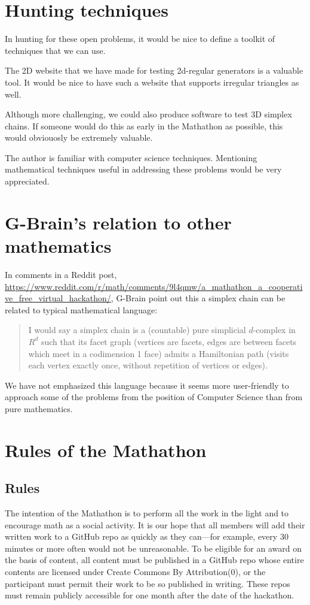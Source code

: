 \documentclass[11pt]{article}
\begin{document}
\section{Hunting techniques}

In hunting for these open problems, it would be nice to define a toolkit of techniques that we can use.

The 2D website that we have made for testing 2d-regular generators is a valuable tool.
It would be nice to have such a website that supports irregular triangles as well.

Although more challenging, we could also produce software to test 3D simplex chains.
If someone would do this as early in the Mathathon as possible, this would obviouosly be extremely valuable.

The author is familiar with computer science techniques. Mentioning mathematical techniques useful in addressing these problems would be
very appreciated.

\section{G-Brain's relation to other mathematics}

In comments in a Reddit post, \url{https://www.reddit.com/r/math/comments/9l4qmw/a_mathathon_a_cooperative_free_virtual_hackathon/},
G-Brain point out this a simplex chain can be related to typical mathematical language:
\begin{quote}
  I would say a simplex chain is a (countable) pure simplicial $d$-complex in $R^d$ such that its facet graph (vertices are facets, edges are between facets which meet in a codimension 1 face) admits a Hamiltonian path (visits each vertex exactly once, without repetition of vertices or edges).
\end{quote}
We have not emphasized this language because it seems more user-friendly to approach some of the problems from the position of Computer Science than from pure mathematics.

\section{Rules of the Mathathon}

\subsection{Rules}

The intention of the Mathathon is to perform all the work in the light and to encourage math
as a social activity.
It is our hope that all members will add their written work to a GitHub repo as quickly
as they can---for example, every 30 minutes or more often would not be unreasonable.
To be eligible for an award on the basis of content, all content must be published in a GitHub repo
whose entire contents are licensed under Create Commons By Attribution(0), or the
participant must permit their work to be so published in writing.
These repos must remain publicly accessible for one month after the date of the hackathon.
\end{document}
